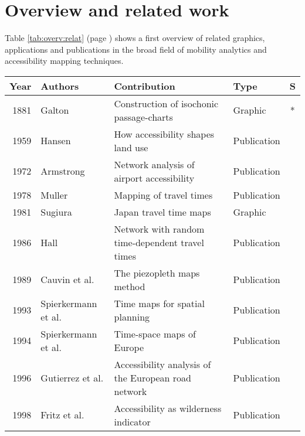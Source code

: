 
\cleardoublepage
\chapter{Overview and related work}
  \label{chap:overv}

  Table \ref{tab:overv:relat} (page \pageref{tab:overv:relat}) shows a first
  overview of related graphics, applications and publications in the broad
  field of mobility analytics and accessibility mapping techniques.\par

  \begin{table}[htb]
    \tiny \centering
    \begin{tabular}{r|l|l|l|c}
     \textbf{Year} & \textbf{Authors} & \textbf{Contribution} & \textbf{Type} & \textbf{S} \\
     \hline
      1881 & Galton \cite{galton1881construction} & Construction of isochonic passage-charts  & Graphic  & * \\
      1959 & Hansen \cite{hansen1959accessibility} & How accessibility shapes land use & Publication & \\
      1972 & Armstrong \cite{armstrong1972network} & Network analysis of airport accessibility  & Publication  & \\
      1978 & Muller \cite{muller1978mapping} & Mapping of travel times  & Publication  & \\
      1981 & Sugiura \cite{Sugiura1981} & Japan travel time maps  & Graphic  & \\
      1986 & Hall \cite{hall1986fastest} & Network with random time-dependent travel times  &  Publication & \\
      1989 & Cauvin et al. \cite{cauvin1989cartographic} & The piezopleth maps method  & Publication  & \\
      1993 & Spierkermann et al. \cite{spiekermann1993zeitkarten} & Time maps for spatial planning  & Publication  & \\
      1994 & Spierkermann et al. \cite{spiekermann1994new} & Time-space maps of Europe  & Publication  & \\
      1996 & Gutierrez et al. \cite{gutierrez1996accessibility} & Accessibility analysis of the European road network  & Publication  & \\
      1998 & Fritz et al. \cite{fritz1998accessibility} &  Accessibility as wilderness indicator  & Publication  & \\

\end{tabular}
\end{table}
